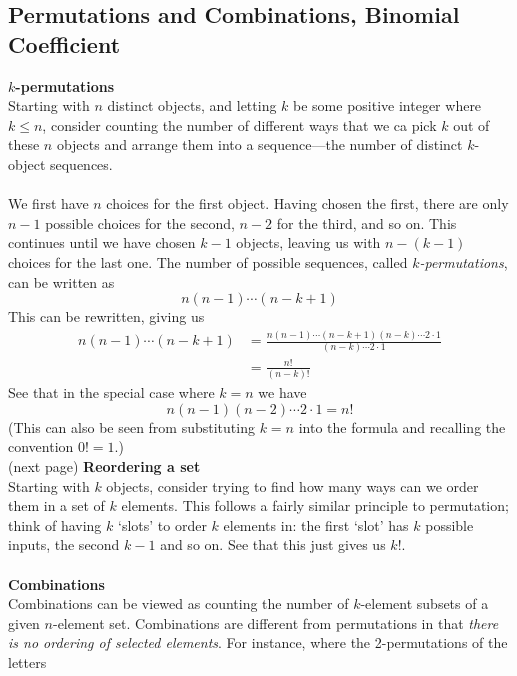 \documentclass{report}
\begin{document}
\subsection{Permutations and Combinations, Binomial Coefficient}
\textbf{$k$-permutations}\\
Starting with $n$ distinct objects, and letting $k$ be some positive integer where $k\leq n$, 
consider counting the number of different ways that we ca  pick $k$ out of these $n$ objects and arrange them
into a sequence---the number of distinct $k$-object sequences.\\
\vspace{1mm}\\
We first have $n$ choices for the first object. 
Having chosen the first, there are only $n-1$ possible choices for the second, $n-2$ for the third, and so on.
This continues until we have chosen $k-1$ objects, leaving us with $n-(k-1)$ choices for the last one. The 
number of possible sequences, called \textit{$k$-permutations}, can be written as
\begin{equation*}
n(n-1)\cdots(n-k+1)
\end{equation*}
This can be rewritten, giving us
\begin{align*}
n(n-1)\cdots(n-k+1)&=\frac{n(n-1)\cdots(n-k+1)(n-k)\cdots2\cdot1}{(n-k)\cdots2\cdot1}\\
&=\frac{n!}{(n-k)!}
\end{align*}
See that in the special case where $k=n$ we have
\begin{equation*}
n(n-1)(n-2)\cdots2\cdot1=n!
\end{equation*}
(This can also be seen from substituting $k=n$ into the formula and recalling the convention $0!=1$.)\\
(next page)
\newpage
\noindent\textbf{Reordering a set}\\
Starting with $k$ objects, consider trying to find how many ways can we order them in a set of $k$ elements. 
This follows a fairly similar principle to permutation; think of having $k$ `slots' to order $k$ elements in: 
the first `slot' has $k$ possible inputs, the second $k-1$ and so on. See that this just gives us $k!$.\\
\vspace{1mm}\\
\textbf{Combinations}\\
Combinations can be viewed as counting the number of $k$-element subsets of a given $n$-element set.
Combinations are different from permutations in that
\textit{there is no ordering of selected elements}. For instance, where the 2-permutations of the letters 
\end{document}
